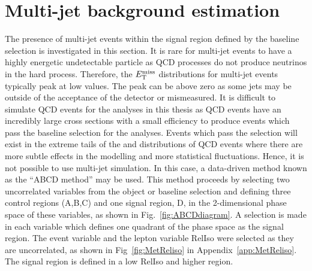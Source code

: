 \section{Multi-jet background estimation}
\label{sec:QCDbackground}
The presence of multi-jet events within the signal region defined by the baseline selection is investigated in this section. It is rare for multi-jet events to have a highly energetic undetectable particle as QCD processes do not produce neutrinos in the hard process. Therefore, the $E_{\mathrm{T}}^{\text{miss}}$ distributions for multi-jet events typically peak at low values. The peak can be above zero as some jets may be outside of the acceptance of the detector or mismeasured.  It is difficult to simulate QCD events for the analyses in this thesis as QCD events have an incredibly large cross sections with a small efficiency to produce events which pass the baseline selection for the \tttt analyses. Events which pass the selection will exist in the extreme tails of the \njets and \nbtags distributions of QCD events where there are more subtle effects in the modelling and more statistical fluctuations. Hence, it is not possible to use multi-jet simulation. In this case, a data-driven method known as the ``ABCD method'' may be used. This method proceeds by selecting two uncorrelated variables from the object or baseline selection and defining three control regions (A,B,C) and one signal region, D, in the 2-dimensional phase space of these variables, as shown in Fig.~\ref{fig:ABCDdiagram}. A selection is made in each variable which defines one quadrant of the phase space as the signal region.  The event variable \MET and the lepton variable RelIso were selected as they are uncorrelated, as shown in Fig~\ref{fig:MetReliso} in Appendix~\ref{app:MetReliso}. The signal region is defined in a low RelIso and higher \MET region.\\
